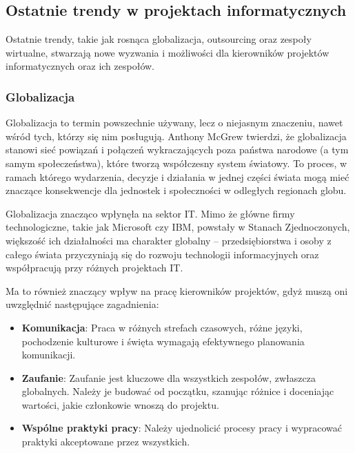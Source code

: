 \subsection{Ostatnie trendy w projektach informatycznych}
Ostatnie trendy, takie jak rosnąca globalizacja, outsourcing oraz zespoły wirtualne, stwarzają nowe wyzwania i możliwości dla kierowników projektów informatycznych oraz ich zespołów.\autocite{ITPM}

\subsubsection{Globalizacja}
Globalizacja to termin powszechnie używany, lecz o niejasnym znaczeniu, nawet wśród tych, którzy się nim posługują.\autocite{robertson2007globalization} Anthony McGrew twierdzi, że globalizacja stanowi sieć powiązań i połączeń wykraczających poza państwa narodowe (a tym samym społeczeństwa), które tworzą współczesny system światowy. To proces, w ramach którego wydarzenia, decyzje i działania w jednej części świata mogą mieć znaczące konsekwencje dla jednostek i społeczności w odległych regionach globu.\autocite{McGrew1990}

Globalizacja znacząco wpłynęła na sektor IT. Mimo że główne firmy technologiczne, takie jak Microsoft czy IBM, powstały w Stanach Zjednoczonych, większość ich działalności ma charakter globalny – przedsiębiorstwa i osoby z całego świata przyczyniają się do rozwoju technologii informacyjnych oraz współpracują przy różnych projektach IT.\autocite{ITPM}

Ma to również znaczący wpływ na pracę kierowników projektów, gdyż muszą oni uwzględnić następujące zagadnienia:

\begin{itemize}
  \item \textbf{Komunikacja}:  
  Praca w różnych strefach czasowych, różne języki, pochodzenie kulturowe i święta wymagają efektywnego planowania komunikacji.
  \item \textbf{Zaufanie}:  
  Zaufanie jest kluczowe dla wszystkich zespołów, zwłaszcza globalnych. Należy je budować od początku, szanując różnice i doceniając wartości, jakie członkowie wnoszą do projektu.
  \item \textbf{Wspólne praktyki pracy}:  
  Należy ujednolicić procesy pracy i wypracować praktyki akceptowane przez wszystkich.\autocite{ITPM}
\end{itemize}

